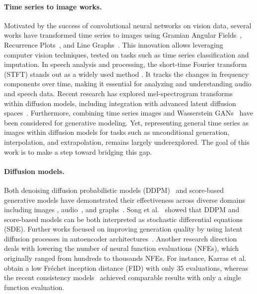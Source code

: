 \documentclass{article}
\begin{document}
\paragraph{Time series to image works.} Motivated by the success of convolutional neural networks on vision data, several works have transformed time series to images using Gramian Angular Fields~\cite{wang2015imaging}, Recurrence Plots~\cite{hatami2018classification}, and Line Graphs~\cite{li2024time}. This innovation allows leveraging computer vision techniques, tested on tasks such as time series classification and imputation. In speech analysis and processing, the short-time Fourier transform (STFT) stands out as a widely used method \cite{allen1977short, allen1977unified, vetterli1992wavelets, flandrin2004empirical}. It tracks the changes in frequency components over time, making it essential for analyzing and understanding audio and speech data. Recent research \cite{popov2021grad, chen2022resgrad} has explored mel-spectrogram transforms within diffusion models, including integration with advanced latent diffusion spaces~\cite{liu2023audioldm}. Furthermore, combining time series images and Wasserstein GANs~\cite{brophy2019quick, hellermann2021leveraging} have been considered for generative modeling. Yet, representing general time series as images within diffusion models for tasks such as unconditional generation, interpolation, and extrapolation, remains largely underexplored. The goal of this work is to make a step toward bridging this gap.


\paragraph{Diffusion models.} Both denoising diffusion probabilistic models (DDPM)~\cite{sohl2015deep,ho2020denoising} and score-based generative models \cite{song2019generative, song2020improved} have demonstrated their effectiveness across diverse domains including images \cite{rombach2022high,ho2022jmlr}, audio~\cite{chen2021wavegrad, kong2021diffwave}, and graphs~\cite{niu2020permutation,yan2023swingnn,berman2024generative}. Song et al.~\cite{song2021scorebased} showed that DDPM and score-based models can be both interpreted as stochastic differential equations (SDE). Further works focused on improving generation quality by using latent diffusion processes in autoencoder architectures~\cite{rombach2022high}. Another research direction deals with lowering the number of neural function evaluations (NFEs), which originally ranged from hundreds to thousands NFEs. For instance, Karras et al.~\cite{karras2022elucidating} obtain a low Fr\'echet inception distance (FID) with only $35$ evaluations, whereas the recent consistency models~\cite{song2024improved} achieved comparable results with only a single function evaluation.
\end{document}

